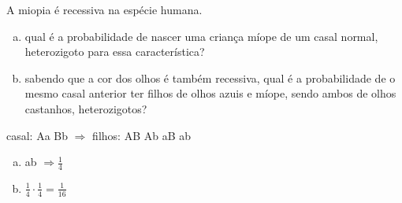 \begin{ex}
A miopia é recessiva na espécie humana.
   \begin{enumerate}[(a)]
   \item  qual é a probabilidade de nascer uma criança míope de um casal normal, heterozigoto para essa característica?
   \item sabendo que a cor dos olhos é também recessiva, qual é a probabilidade de o mesmo casal anterior ter filhos de olhos azuis e míope, sendo ambos de olhos castanhos, heterozigotos?
   \end{enumerate}
    \begin{sol}
     \phantom{A} 
     casal: Aa  Bb $\Longrightarrow$ filhos: AB Ab  aB ab
     \begin{enumerate} [(a)]
         \item ab $\Longrightarrow \frac{1}{4}$
         \item $\frac{1}{4}\cdot\frac{1}{4}=\frac{1}{16}$
     \end{enumerate} 
    \end{sol}
\end{ex}